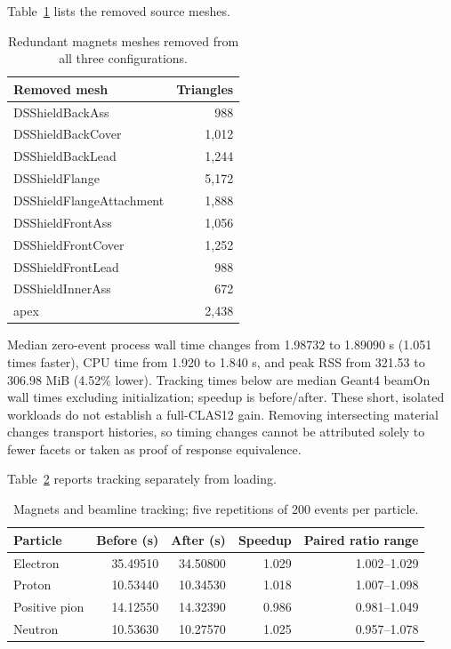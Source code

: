 Table~\ref{tab:magnets-dedup-inventory} lists the removed source meshes.
\begin{table}[htbp]
\centering
\caption{Redundant magnets meshes removed from all three configurations.}
\label{tab:magnets-dedup-inventory}
\begin{tabular}{lr}
\toprule
Removed mesh & Triangles \\
\midrule
DSShieldBackAss & 988 \\
DSShieldBackCover & 1,012 \\
DSShieldBackLead & 1,244 \\
DSShieldFlange & 5,172 \\
DSShieldFlangeAttachment & 1,888 \\
DSShieldFrontAss & 1,056 \\
DSShieldFrontCover & 1,252 \\
DSShieldFrontLead & 988 \\
DSShieldInnerAss & 672 \\
apex & 2,438 \\
\bottomrule
\end{tabular}
\end{table}

Median zero-event process wall time changes from 1.98732 to 1.89090 s (1.051 times faster), CPU time from
1.920 to 1.840 s, and peak RSS from 321.53 to 306.98 MiB (4.52\% lower). Tracking times below are median
Geant4 beamOn wall times excluding initialization; speedup is before/after. These short, isolated workloads do
not establish a full-CLAS12 gain. Removing intersecting material changes transport histories, so timing
changes cannot be attributed solely to fewer facets or taken as proof of response equivalence.

Table~\ref{tab:magnets-dedup-tracking} reports tracking separately from loading.
\begin{table}[htbp]
\centering
\caption{Magnets and beamline tracking; five repetitions of 200 events per particle.}
\label{tab:magnets-dedup-tracking}
\begin{tabular}{lrrrr}
\toprule
Particle & Before (s) & After (s) & Speedup & Paired ratio range \\
\midrule
Electron & 35.49510 & 34.50800 & 1.029 & 1.002--1.029 \\
Proton & 10.53440 & 10.34530 & 1.018 & 1.007--1.098 \\
Positive pion & 14.12550 & 14.32390 & 0.986 & 0.981--1.049 \\
Neutron & 10.53630 & 10.27570 & 1.025 & 0.957--1.078 \\
\bottomrule
\end{tabular}
\end{table}

